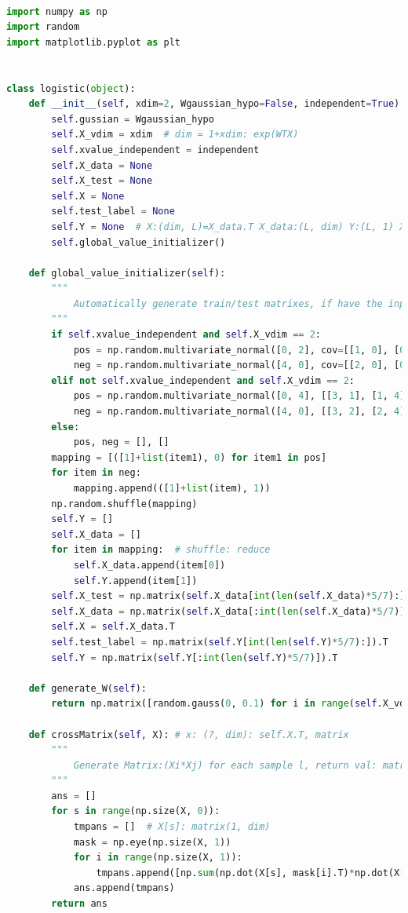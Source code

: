 \documentclass{article}
\begin{document}
\begin{lstlisting}[language={Python},title={hyperparams.py}]

import numpy as np
import random
import matplotlib.pyplot as plt


class logistic(object):
    def __init__(self, xdim=2, Wgaussian_hypo=False, independent=True):
        self.gussian = Wgaussian_hypo
        self.X_vdim = xdim  # dim = 1+xdim: exp(WTX)
        self.xvalue_independent = independent
        self.X_data = None
        self.X_test = None
        self.X = None
        self.test_label = None
        self.Y = None  # X:(dim, L)=X_data.T X_data:(L, dim) Y:(L, 1) X_test:(dim, l_test)
        self.global_value_initializer()

    def global_value_initializer(self):
        """
            Automatically generate train/test matrixes, if have the input from outside, apply val directly.
        """
        if self.xvalue_independent and self.X_vdim == 2:
            pos = np.random.multivariate_normal([0, 2], cov=[[1, 0], [0, 1]], size=500)  # pos
            neg = np.random.multivariate_normal([4, 0], cov=[[2, 0], [0, 2]], size=500)  # neg
        elif not self.xvalue_independent and self.X_vdim == 2:
            pos = np.random.multivariate_normal([0, 4], [[3, 1], [1, 4]], size=500)
            neg = np.random.multivariate_normal([4, 0], [[3, 2], [2, 4]], size=500)
        else:
            pos, neg = [], []
        mapping = [([1]+list(item1), 0) for item1 in pos]
        for item in neg:
            mapping.append(([1]+list(item), 1))
        np.random.shuffle(mapping)
        self.Y = []
        self.X_data = []
        for item in mapping:  # shuffle: reduce
            self.X_data.append(item[0])
            self.Y.append(item[1])
        self.X_test = np.matrix(self.X_data[int(len(self.X_data)*5/7):]).T
        self.X_data = np.matrix(self.X_data[:int(len(self.X_data)*5/7)])
        self.X = self.X_data.T
        self.test_label = np.matrix(self.Y[int(len(self.Y)*5/7):]).T
        self.Y = np.matrix(self.Y[:int(len(self.Y)*5/7)]).T

    def generate_W(self):
        return np.matrix([random.gauss(0, 0.1) for i in range(self.X_vdim+1)]).T

    def crossMatrix(self, X): # x: (?, dim): self.X.T, matrix
        """
            Generate Matrix:(Xi*Xj) for each sample l, return val: matrix(dim, dim, L)
        """
        ans = []
        for s in range(np.size(X, 0)):
            tmpans = []  # X[s]: matrix(1, dim)
            mask = np.eye(np.size(X, 1))
            for i in range(np.size(X, 1)):
                tmpans.append([np.sum(np.dot(X[s], mask[i].T)*np.dot(X[s], mask[j].T)) for j in range(np.size(X, 1))])
            ans.append(tmpans)
        return ans


\end{lstlisting}
\end{document}
